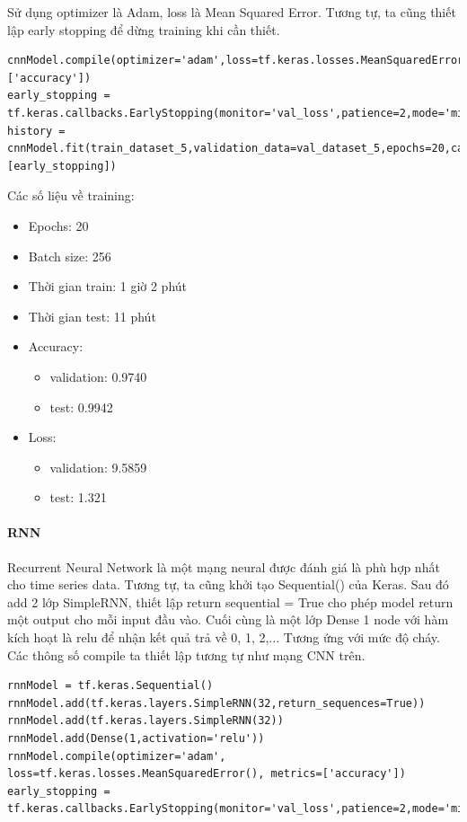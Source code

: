 \documentclass{article}
\begin{document}
Sử dụng optimizer là Adam, loss là Mean Squared Error. Tương tự, ta cũng thiết lập early stopping để dừng training khi cần thiết.

\begin{verbatim}
cnnModel.compile(optimizer='adam',loss=tf.keras.losses.MeanSquaredError(),metrics=['accuracy'])
early_stopping = tf.keras.callbacks.EarlyStopping(monitor='val_loss',patience=2,mode='min')
history = cnnModel.fit(train_dataset_5,validation_data=val_dataset_5,epochs=20,callbacks=[early_stopping])
\end{verbatim}

Các số liệu về training:
\begin{itemize}
	\item Epochs: 20
	\item Batch size: 256
	\item Thời gian train: 1 giờ 2 phút
	\item Thời gian test: 11 phút
	\item Accuracy:
	      \begin{itemize}
		      \item validation: 0.9740
		      \item test: 0.9942
	      \end{itemize}
	\item Loss:
	      \begin{itemize}
		      \item validation: 9.5859
		      \item test: 1.321
	      \end{itemize}
\end{itemize}

\paragraph{RNN} Recurrent Neural Network là một mạng neural được đánh giá là phù hợp nhất cho time series data. Tương tự, ta cũng khởi tạo Sequential() của Keras. Sau đó add 2 lớp SimpleRNN, thiết lập return sequential = True cho phép model return một output cho mỗi input đầu vào. Cuối cùng là một lớp Dense 1 node với hàm kích hoạt là relu để nhận kết quả trả về 0, 1, 2,... Tương ứng với mức độ cháy. Các thông số compile ta thiết lập tương tự như mạng CNN trên.

\begin{verbatim}
rnnModel = tf.keras.Sequential()
rnnModel.add(tf.keras.layers.SimpleRNN(32,return_sequences=True))
rnnModel.add(tf.keras.layers.SimpleRNN(32))
rnnModel.add(Dense(1,activation='relu'))
rnnModel.compile(optimizer='adam', loss=tf.keras.losses.MeanSquaredError(), metrics=['accuracy'])
early_stopping = tf.keras.callbacks.EarlyStopping(monitor='val_loss',patience=2,mode='min')
\end{verbatim}
\end{document}
